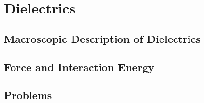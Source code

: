 \setcounter{chapter}{0}
\renewcommand{\thechapter}{3}
\chapter{Dielectrics}
\setcounter{equation}{0}	        %

\section{Macroscopic Description of Dielectrics}

\section{Force and Interaction Energy}


\section*{Problems}


